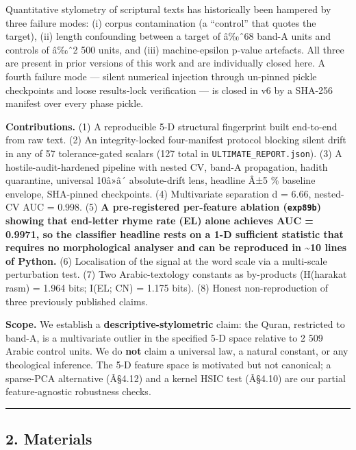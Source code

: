 \documentclass[
]{article}
\begin{document}
Quantitative stylometry of scriptural texts has historically been
hampered by three failure modes: (i) corpus contamination (a ``control''
that quotes the target), (ii) length confounding between a target of
â‰ˆ68 band-A units and controls of â‰ˆ2 500 units, and (iii)
machine-epsilon p-value artefacts. All three are present in prior
versions of this work and are individually closed here. A fourth failure
mode --- silent numerical injection through un-pinned pickle checkpoints
and loose results-lock verification --- is closed in v6 by a SHA-256
manifest over every phase pickle.

\textbf{Contributions.} (1) A reproducible 5-D structural fingerprint
built end-to-end from raw text. (2) An integrity-locked four-manifest
protocol blocking silent drift in any of 57 tolerance-gated scalars (127
total in \texttt{ULTIMATE\_REPORT.json}). (3) A hostile-audit-hardened
pipeline with nested CV, band-A propagation, hadith quarantine,
universal 10â»â´ absolute-drift lens, headline Â±5 \% baseline envelope,
SHA-pinned checkpoints. (4) Multivariate separation d = 6.66, nested-CV
AUC = 0.998. (5) \textbf{A pre-registered per-feature ablation
(\texttt{exp89b}) showing that end-letter rhyme rate (EL) alone achieves
AUC = 0.9971, so the classifier headline rests on a 1-D sufficient
statistic that requires no morphological analyser and can be reproduced
in \textasciitilde10 lines of Python.} (6) Localisation of the signal at
the word scale via a multi-scale perturbation test. (7) Two
Arabic-textology constants as by-products (H(harakat \textbar{} rasm) =
1.964 bits; I(EL; CN) = 1.175 bits). (8) Honest non-reproduction of
three previously published claims.

\textbf{Scope.} We establish a \textbf{descriptive-stylometric} claim:
the Quran, restricted to band-A, is a multivariate outlier in the
specified 5-D space relative to 2 509 Arabic control units. We do
\textbf{not} claim a universal law, a natural constant, or any
theological inference. The 5-D feature space is motivated but not
canonical; a sparse-PCA alternative (Â§4.12) and a kernel HSIC test
(Â§4.10) are our partial feature-agnostic robustness checks.

\begin{center}\rule{0.5\linewidth}{0.5pt}\end{center}

\subsection{2. Materials}\label{materials}
\end{document}
